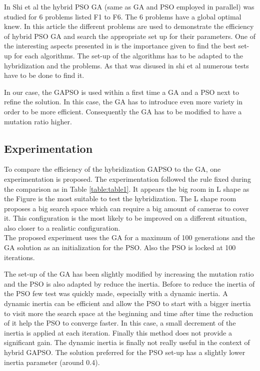 In Shi et al \cite{77*shi2005} the hybrid PSO GA (same as GA and PSO employed in parallel) was studied for 6  problems listed F1 to F6. The 6 problems have a global optimal knew.  In this article \cite{77*shi2005} the different problems are used to demonstrate the efficiency of hybrid PSO GA and search the appropriate set up for their parameters. One of the interesting aspects presented in \cite{77*shi2005} is the importance given to find  the best set-up for each algorithms. 
The set-up of the algorithms has to be adapted to the hybridization and the problems. As that was disused in shi et al \cite{77*shi2005}  numerous tests have to be done to find it.

 In our case, the GAPSO is used within a first time a GA and a PSO next to refine the solution. In this case, the GA has to introduce even more variety in order to be more efficient. Consequently the GA has to be modified to have a mutation ratio higher.   



\subsection{Experimentation }
To compare the efficiency of the hybridization GAPSO to the GA, one experimentation is proposed.
The experimentation followed the rule fixed during the comparison as in Table \ref{table:table1}. %
It appears the big room in L shape as the Figure  is the most suitable to test the hybridization.  %
The L shape room proposes a big search space which can require a big amount of cameras to cover it. This configuration is the most likely to be improved on a different situation, also closer to a realistic configuration.\\
The proposed experiment uses the GA for a maximum of 100 generations and the GA solution as an initialization for the PSO. Also the PSO is locked at 100 iterations. %

The set-up of the GA has been slightly modified by increasing the mutation ratio and the PSO is also adapted by reduce the inertia.
 Before to reduce the inertia of the PSO few test was quickly made, especially with a dynamic inertia. A dynamic inertia can be efficient and allow the PSO to start with a bigger inertia to visit more the search space at the beginning and time after time the reduction of it help the PSO to converge faster. In this case, a small decrement of the inertia is applied at each iteration. Finally this method does not provide a significant gain. The dynamic inertia is finally  not really useful in the context of hybrid GAPSO. The solution  preferred for the PSO set-up has a slightly lower inertia parameter (around 0.4).

